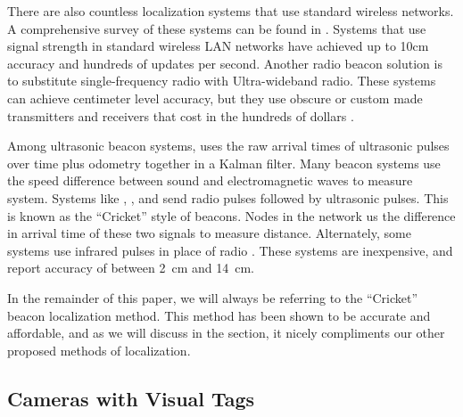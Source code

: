 \documentclass{article}
\begin{document}
    There are also countless localization systems that use standard wireless networks. A comprehensive survey of these systems can be found in \cite{liu_survey_2007}. Systems that use signal strength in standard wireless LAN networks have achieved up to 10\si{\centi\meter} accuracy and hundreds of updates per second. Another radio beacon solution is to substitute single-frequency radio with Ultra-wideband radio. These systems can achieve centimeter level accuracy, but they use obscure or custom made transmitters and receivers that cost in the hundreds of dollars \cite{zebra_dart_2017} \cite{pozyx_pozyx_2017}.

    Among ultrasonic beacon systems, \cite{kleeman_optimal_1992} uses the raw arrival times of ultrasonic pulses over time plus odometry together in a Kalman filter. Many beacon systems use the speed difference between sound and electromagnetic waves to measure system. Systems like \cite{smith_tracking_2004}, \cite{ward_new_1997}, and \cite{kim_advanced_2008} send radio pulses followed by ultrasonic pulses. This is known as the ``Cricket'' style of beacons. Nodes in the network us the difference in arrival time of these two signals to measure distance. Alternately, some systems use infrared pulses in place of radio \cite{ghidary_new_1999} \cite{yucel_development_2012}. These systems are inexpensive, and report accuracy of between \SI{2}{\centi\meter} and \SI{14}{\centi\meter}.

    In the remainder of this paper, we will always be referring to the ``Cricket'' beacon localization method. This method has been shown to be accurate and affordable, and as we will discuss in the  section, it nicely compliments our other proposed methods of localization.

  \subsection{Cameras with Visual Tags}
\end{document}
